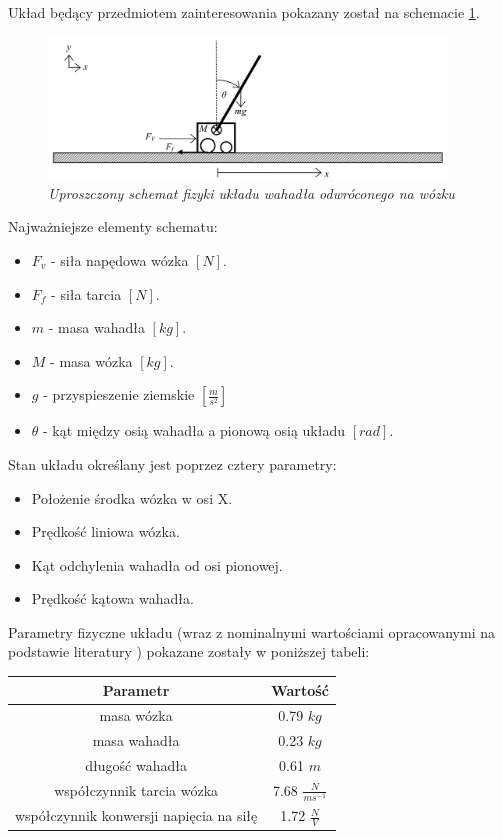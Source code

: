 \documentclass[12pt, oneside]{report}
\theoremstyle{definition}
\begin{document}
Układ będący przedmiotem zainteresowania pokazany został na schemacie \ref{SytemSchemeImage}.

\begin{figure}[H]
	\centering
		\includegraphics[width = 300pt]{SystemScheme} 
		\caption{\textit{Uproszczony schemat fizyki układu wahadła odwróconego na wózku \cite{LIMP} }}
		\label{SytemSchemeImage}
\end{figure}

Najważniejsze elementy schematu:
\begin{itemize}
\item \(F_v\) - siła napędowa wózka \([N]\).
\item \(F_f\) - siła tarcia \([N]\).
\item \(m\) - masa wahadła \([kg]\). 
\item \(M\) - masa wózka \([kg]\).
\item \(g\) - przyspieszenie ziemskie \([\frac{m}{s^2}]\) 
\item \(\theta\) - kąt między osią wahadła a pionową osią układu \([rad]\).
\end{itemize}

Stan układu określany jest poprzez cztery parametry:
\begin{itemize}
\item Położenie środka wózka w osi X.
\item Prędkość liniowa wózka.
\item Kąt odchylenia wahadła od osi pionowej.
\item Prędkość kątowa wahadła.
\end{itemize}

Parametry fizyczne układu (wraz z nominalnymi wartościami opracowanymi na podstawie literatury \cite{LIMP}) pokazane zostały w poniższej tabeli:
\begin{center}
\begin{tabular}{|c|c|}
  \hline 
  Parametr & Wartość\\
  \hline
  masa wózka & 0.79 \(kg\) \\
  \hline
  masa wahadła & 0.23 \(kg\) \\
  \hline
  długość wahadła & 0.61 \(m\) \\
  \hline
  współczynnik tarcia wózka & 7.68 \(\frac{N}{ms^{-1}}\) \\
  \hline
  współczynnik konwersji napięcia na siłę & 1.72 \(\frac{N}{V}\) \\
  \hline
\end{tabular} 
\end{center}
\end{document}
